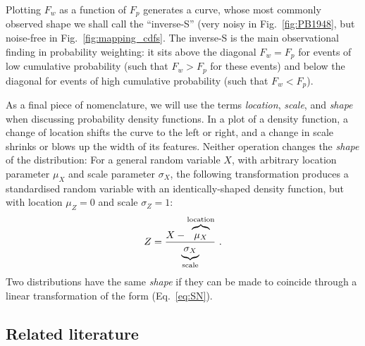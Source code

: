 \documentclass[a4paper, 12pt]{article}
\newcommand{\elabel}[1]{\label{eq:#1}}
\newcommand{\eref}[1]{(Eq.~\ref{eq:#1})}
\newcommand{\fref}[1]{Fig.~\ref{fig:#1}}
\newcommand{\be}{\begin{equation}}
\newcommand{\ee}{\end{equation}}
\newcommand{\ND}{\mathcal{N}} %
\begin{document}
Plotting $F_w$ as a function of $F_p$ generates a curve, whose most commonly observed shape we shall call the ``inverse-S'' (very noisy in \fref{PB1948}, but noise-free in \fref{mapping_cdfs}. The inverse-S is the main observational finding in probability weighting: it sits above the diagonal $F_w=F_p$ for events of low cumulative probability (such that $F_w>F_p$ for these events) and below the diagonal for events of high cumulative probability (such that $F_w<F_p$).

As a final piece of nomenclature, we will use the terms \textit{location}, \textit{scale}, and \textit{shape} when discussing probability density functions. 
In a plot of a density function, a change of location shifts the curve to the left or right, and a change in scale shrinks or blows up the width of its features. Neither operation changes the \textit{shape} of the distribution:
For a general random variable $X$, with arbitrary location parameter $\mu_X$ and scale parameter $\sigma_X$, the following transformation produces a standardised random variable with an identically-shaped density function, but with location $\mu_Z=0$ and scale $\sigma_Z=1$:
%
\be
Z = \frac{X-\overbrace{\mu_X \mathstrut}^{\text{location}}}{\underbrace{\sigma_X\mathstrut}_{\text{scale}}}~.
\elabel{SN}
\ee
%
Two distributions have the same \textit{shape} if they can be made to coincide through a linear transformation of the form \eref{SN}.

\subsection{Related literature}
\end{document}
